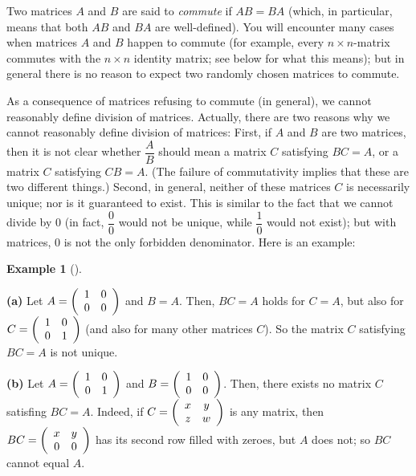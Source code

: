 \documentclass[numbers=enddot,12pt,final,onecolumn,notitlepage]{scrartcl}%
\theoremstyle{definition}
\newtheorem{exam}[theo]{Example}
\newenvironment{example}[1][]
{\begin{exam}[#1]\begin{leftbar}}
{\end{leftbar}\end{exam}}
\begin{document}
Two matrices $A$ and $B$ are said to \textit{commute} if $AB=BA$ (which, in
particular, means that both $AB$ and $BA$ are well-defined). You will
encounter many cases when matrices $A$ and $B$ happen to commute (for example,
every $n\times n$-matrix commutes with the $n\times n$ identity matrix; see
below for what this means); but in general there is no reason to expect two
randomly chosen matrices to commute.

As a consequence of matrices refusing to commute (in general), we cannot
reasonably define division of matrices. Actually, there are two reasons why we
cannot reasonably define division of matrices: First, if $A$ and $B$ are two
matrices, then it is not clear whether $\dfrac{A}{B}$ should mean a matrix $C$
satisfying $BC=A$, or a matrix $C$ satisfying $CB=A$. (The failure of
commutativity implies that these are two different things.) Second, in
general, neither of these matrices $C$ is necessarily unique; nor is it
guaranteed to exist. This is similar to the fact that we cannot divide by $0$
(in fact, $\dfrac{0}{0}$ would not be unique, while $\dfrac{1}{0}$ would not
exist); but with matrices, $0$ is not the only forbidden denominator. Here is
an example:

\begin{example}
\textbf{(a)} Let $A=\left(
\begin{array}
[c]{cc}%
1 & 0\\
0 & 0
\end{array}
\right)  $ and $B=A$. Then, $BC=A$ holds for $C=A$, but also for $C=\left(
\begin{array}
[c]{cc}%
1 & 0\\
0 & 1
\end{array}
\right)  $ (and also for many other matrices $C$). So the matrix $C$
satisfying $BC=A$ is not unique.

\textbf{(b)} Let $A=\left(
\begin{array}
[c]{cc}%
1 & 0\\
0 & 1
\end{array}
\right)  $ and $B=\left(
\begin{array}
[c]{cc}%
1 & 0\\
0 & 0
\end{array}
\right)  $. Then, there exists no matrix $C$ satisfing $BC=A$. Indeed, if
$C=\left(
\begin{array}
[c]{cc}%
x & y\\
z & w
\end{array}
\right)  $ is any matrix, then $BC=\left(
\begin{array}
[c]{cc}%
x & y\\
0 & 0
\end{array}
\right)  $ has its second row filled with zeroes, but $A$ does not; so $BC$
cannot equal $A$.
\end{example}
\end{document}
